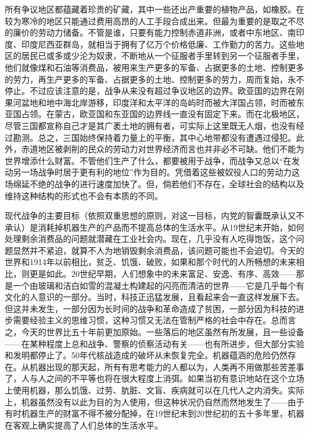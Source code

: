 所有争议地区都蕴藏着珍贵的矿藏，其中一些还出产重要的植物产品，如橡胶。在较为寒冷的地区只能通过费用高昂的人工手段合成出来。但最为重要的是取之不尽的廉价的劳动力储备。不管是谁，只要有能力控制赤道非洲，或者中东地区、南印度、印度尼西亚群岛，就相当于拥有了亿万个价格低廉、工作勤力的苦力。这些地区的居民已或多或少沦为奴隶，不断地从一个征服者手里转到另一个征服者手里，他们就像煤和石油等消费品，被用来生产更多的军备、占据更多的土地、控制更多的劳力，再生产更多的军备、占据更多的土地、控制更多的劳力，周而复始，永不停止。不过应该注意的是，战争从来没有超过争议地区的边界。欧亚国的边界在刚果河盆地和地中海北岸游移，印度洋和太平洋的岛屿时而被大洋国占领，时而被东亚国占领。在蒙古，欧亚国和东亚国的边界线一直没有固定下来。而在北极地区，尽管三国都宣称自己才是其广袤土地的拥有者，可实际上这里既无人烟，也没有经过勘测。总之，三国始终保持着力量上的平衡，其中心地带都没有遭遇过侵犯。此外，赤道地区被剥削的民众的劳动力对世界经济而言也并非必不可缺。他们不能为世界增添什么财富。不管他们生产了什么，都要被用于战争，而战争又总以``在发动另一场战争时居于更有利的地位''作为目的。凭借着这些被奴役人口的劳动力这场绵延不绝的战争的进行速度加快了。但，倘若他们不存在，全球社会的结构以及维持这种结构的形式也不会有本质的不同。

现代战争的主要目标（依照双重思想的原则，对这一目标，内党的智囊既承认又不承认）是消耗掉机器生产的产品而不提高总体的生活水平。从19世纪末开始，如何处理剩余消费品的问题就潜藏在工业社会内。现在，几乎没有人吃得饱饭，这个问题显然并不紧迫，就算不人为地销毁剩余消费品，该问题可能也不会迫切。今天的世界和1914年以前相比，贫乏、饥饿、破败，如果和那个时代的人所畅想的未来相比，则更是如此。20世纪早期，人们想象中的未来富足、安逸、有序、高效——那是一个由玻璃和洁白如雪的混凝土构建起的闪亮而清洁的世界——它是几乎每个有文化的人意识的一部分。当时，科技正迅猛发展，且看起来会一直这样发展下去。但这并未发生，一部分因为长时间的战争和革命造成了贫困，一部分因为科技的进步需要经验主义的思维习惯，这种习惯又无法在管制严格的社会中存在。总而言之，今天的世界比五十年前更加原始。一些落后的地区虽然有所发展，且一些设备——在某种程度上总和战争、警察的侦察活动有关——也有所进步，但大部分实验和发明都停止了。50年代核战造成的破坏从未恢复完全。机器蕴涵的危险仍然存在。从机器出现的那天起，所有有思考能力的人都以为，人类再不用做那些苦差事了，人与人之间的不平等也将在很大程度上消弭。如果当初有意识地站在这个立场上使用机器，那么饥饿、过劳、肮脏、文盲、疾病就可以在几代人之内消失。实际上，机器虽然没有以此为目的为人使用，但这种状况仍自然而然地发生了——由于有时机器生产的财富不得不被分配掉，在19世纪末到20世纪初的五十多年里，机器在客观上确实提高了人们总体的生活水平。


